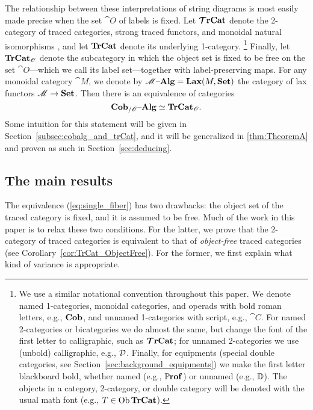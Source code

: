 \documentclass[12pt,oneside,article,draft]{memoir}
\begin{document}
The relationship between these interpretations of string diagrams is most easily made precise when
the set $\cat{O}$ of labels is fixed. Let $\bm{\mathcal{T}}\mathbf{rCat}$ denote the 2-category of traced categories,
strong traced functors, and monoidal natural isomorphisms \cite{HK}, and let $\mathbf{TrCat}$ denote its
underlying 1-category.%
\footnote{
   We use a similar notational convention throughout this paper. We denote named 1-categories,
   monoidal categories, and operads with bold roman letters, e.g., $\mathbf{Cob}$, and unnamed
   1-categories with script, e.g., $\cat{C}$. For named 2-categories or bicategories we do almost
   the same, but change the font of the first letter to calligraphic, such as $\bm{\mathcal{T}}\mathbf{rCat}$; for
   unnamed 2-categories we use (unbold) calligraphic, e.g., $\mathcal{D}$. Finally, for equipments
   (special double categories, see Section~\ref{sec:background_equipments}) we make the first letter
   blackboard bold, whether named (e.g., $\mathbb{P}\mathbf{rof}$) or unnamed (e.g., $\mathbb{D}$). The
   objects in a category, 2-category, or double category will be denoted with the usual math font
   (e.g., $T\in\operatorname{Ob}\mathbf{TrCat}$).
}
Finally, let $\mathbf{TrCat}_{\mathscr{O}}$ denote the subcategory in which the object set is fixed to be free
on the set $\cat{O}$---which we call its label set---together with label-preserving maps. For any
monoidal category $\cat{M}$, we denote by $\mathscr{M}{\text \textendash}\mathbf{Alg}=\mathbf{Lax}(M,\mathbf{Set})$ the category of lax
functors $\mathscr{M}\to\mathbf{Set}$. Then there is an equivalence of categories
\begin{equation}\label{eq:single_fiber}
   \mathbf{Cob}_{/\mathscr{O}}{\text \textendash}\mathbf{Alg}\simeq\mathbf{TrCat}_{\mathscr{O}}.
\end{equation}
Some intuition for this statement will be given in Section~\ref{subsec:cobalg_and_trCat}, and it
will be generalized in \ref{thm:TheoremA} and proven as such in Section~\ref{sec:deducing}.

\subsection{The main results}\label{subsec:main_results}

The equivalence (\ref{eq:single_fiber}) has two drawbacks: the object set of the traced category is
fixed, and it is assumed to be free. Much of the work in this paper is to relax these two
conditions. For the latter, we prove that the 2-category of traced categories is equivalent to that
of \emph{object-free} traced categories (see Corollary~\ref{cor:TrCat_ObjectFree}). For the former,
we first explain what kind of variance is appropriate.
\end{document}
